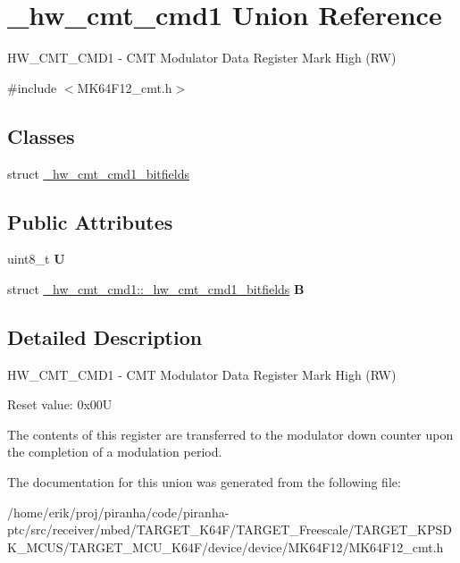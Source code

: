 \hypertarget{union__hw__cmt__cmd1}{}\section{\+\_\+hw\+\_\+cmt\+\_\+cmd1 Union Reference}
\label{union__hw__cmt__cmd1}


H\+W\+\_\+\+C\+M\+T\+\_\+\+C\+M\+D1 -\/ C\+MT Modulator Data Register Mark High (RW)  




{\ttfamily \#include $<$M\+K64\+F12\+\_\+cmt.\+h$>$}

\subsection*{Classes}
\begin{DoxyCompactItemize}
\item 
struct \hyperlink{struct__hw__cmt__cmd1_1_1__hw__cmt__cmd1__bitfields}{\+\_\+hw\+\_\+cmt\+\_\+cmd1\+\_\+bitfields}
\end{DoxyCompactItemize}
\subsection*{Public Attributes}
\begin{DoxyCompactItemize}
\item 
uint8\+\_\+t {\bfseries U}\hypertarget{union__hw__cmt__cmd1_a28b09de77e09afcd07965e1ffc28e99f}{}\label{union__hw__cmt__cmd1_a28b09de77e09afcd07965e1ffc28e99f}

\item 
struct \hyperlink{struct__hw__cmt__cmd1_1_1__hw__cmt__cmd1__bitfields}{\+\_\+hw\+\_\+cmt\+\_\+cmd1\+::\+\_\+hw\+\_\+cmt\+\_\+cmd1\+\_\+bitfields} {\bfseries B}\hypertarget{union__hw__cmt__cmd1_aa0b386a7c32340fc04ee28ff549c0551}{}\label{union__hw__cmt__cmd1_aa0b386a7c32340fc04ee28ff549c0551}

\end{DoxyCompactItemize}


\subsection{Detailed Description}
H\+W\+\_\+\+C\+M\+T\+\_\+\+C\+M\+D1 -\/ C\+MT Modulator Data Register Mark High (RW) 

Reset value\+: 0x00U

The contents of this register are transferred to the modulator down counter upon the completion of a modulation period. 

The documentation for this union was generated from the following file\+:\begin{DoxyCompactItemize}
\item 
/home/erik/proj/piranha/code/piranha-\/ptc/src/receiver/mbed/\+T\+A\+R\+G\+E\+T\+\_\+\+K64\+F/\+T\+A\+R\+G\+E\+T\+\_\+\+Freescale/\+T\+A\+R\+G\+E\+T\+\_\+\+K\+P\+S\+D\+K\+\_\+\+M\+C\+U\+S/\+T\+A\+R\+G\+E\+T\+\_\+\+M\+C\+U\+\_\+\+K64\+F/device/device/\+M\+K64\+F12/M\+K64\+F12\+\_\+cmt.\+h\end{DoxyCompactItemize}
